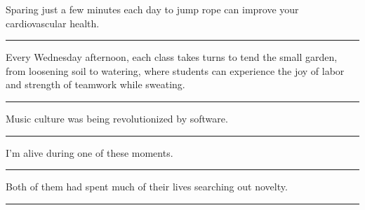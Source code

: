 \documentclass[11pt,a4paper]{article}
\newcommand{\num}[1]{\makebox[1.9em][r]{#1.}\hspace{0.3em}}
\newcommand{\wline}{\noindent\rule{\linewidth}{0.4pt}}
\begin{document}
\begin{minipage}{\linewidth}

\num{4}Sparing just a few minutes each day to jump rope can improve your cardiovascular health.

\vspace{0.25em}

\wline

\end{minipage}

\begin{minipage}{\linewidth}

\num{5}Every Wednesday afternoon, each class takes turns to tend the small garden, from loosening soil to watering, where students can experience the joy of labor and strength of teamwork while sweating.

\vspace{0.25em}

\wline

\end{minipage}

\vspace{0.35em}\vspace{0.15em}

\begin{minipage}{\linewidth}

\num{6}Music culture was being revolutionized by software.

\vspace{0.25em}

\wline

\end{minipage}

\begin{minipage}{\linewidth}

\num{7}I'm alive during one of these moments.

\vspace{0.25em}

\wline

\end{minipage}

\begin{minipage}{\linewidth}

\num{8}Both of them had spent much of their lives searching out novelty.

\vspace{0.25em}

\wline

\end{minipage}
\end{document}
